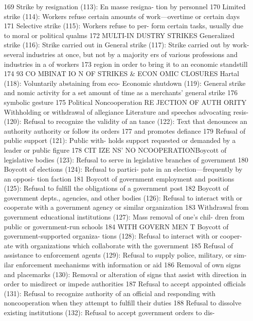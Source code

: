 \documentclass[twoside,a4paper,12pt,fleqn,openany]{extbook}
\begin{document}
 169
Strike by resignation (113): En masse resigna-
tion by personnel
 170
Limited strike (114): Workers refuse certain
amounts of work—overtime or certain days 171
Selective strike (115): Workers refuse to per-
form certain tasks, usually due to moral or
political qualms
 172
MULTI-IN DUSTRY STRIKES
Generalized strike (116): Strike carried out in
 General strike (117): Strike carried out by work-
several industries at once, but not by a majority
 ers of various professions and industries in a
of workers
 173
 region in order to bring it to an economic
standstill
 174
93
CO MBINAT IO N OF STRIKES & ECON OMIC CLOSURES
Hartal (118): Voluntarily abstaining from eco-
 Economic shutdown (119): General strike and
nomic activity for a set amount of time as a
 merchants’ general strike
 176
symbolic gesture
 175
Political Noncooperation
RE JECTION OF AUTH ORITY
Withholding or withdrawal of allegiance
 Literature and speeches advocating resis-
(120): Refusal to recognize the validity of an
 tance (122): Text that denounces an authority
authority or follow its orders
 177
 and promotes defiance
 179
Refusal of public support (121): Public with-
holds support requested or demanded by a
leader or public figure
 178
CIT IZE NS’ NO NCOOPERATIONBoycott of legislative bodies (123): Refusal to
serve in legislative branches of government		
180
Boycott of elections (124): Refusal to partici-
pate in an election—frequently by an opposi-
tion faction
 181
Boycott of government employment and
positions (125): Refusal to fulfill the obligations
of a government post
 182
Boycott of government depts., agencies, and
other bodies (126): Refusal to interact with or
cooperate with a government agency or similar
organization
 183
Withdrawal from government educational
institutions (127): Mass removal of one’s chil-
dren from public or government-run schools		
184
WITH GOVERN MEN T
Boycott of government-supported organiza-
tions (128): Refusal to interact with or cooper-
ate with organizations which collaborate with
the government
 185
Refusal of assistance to enforcement agents
(129): Refusal to supply police, military, or sim-
ilar enforcement mechanisms with information
or aid
 186
Removal of own signs and placemarks (130):
Removal or alteration of signs that assist with
direction in order to misdirect or impede
authorities
 187
Refusal to accept appointed officials (131):
Refusal to recognize authority of an official and
responding with noncooperation when they
attempt to fulfill their duties
 188
Refusal to dissolve existing institutions (132):
Refusal to accept government orders to dis-
\end{document}
